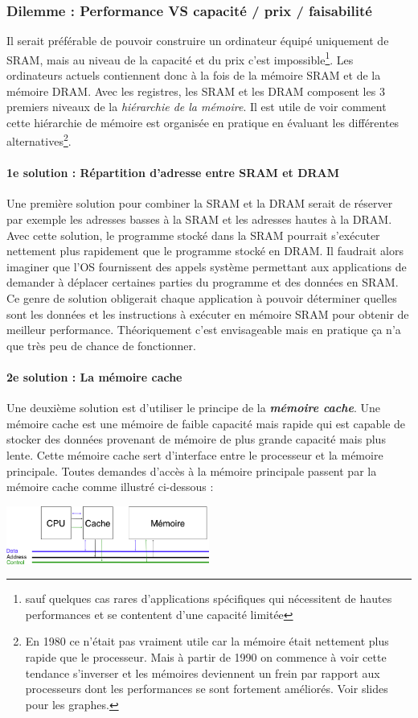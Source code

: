 \subsubsection*{Dilemme : Performance VS capacité / prix / faisabilité}
Il serait préférable de pouvoir construire un ordinateur équipé uniquement de SRAM, mais au niveau de la capacité et du prix c'est impossible\footnote{sauf quelques cas rares d'applications spécifiques qui nécessitent de hautes performances et se contentent d'une capacité limitée}.
Les ordinateurs actuels contiennent donc à la fois de la mémoire SRAM et de la mémoire DRAM.
Avec les registres, les SRAM et les DRAM composent les 3 premiers niveaux de la \textit{hiérarchie de la mémoire}.
Il est utile de voir comment cette hiérarchie de mémoire est organisée en pratique en évaluant les différentes alternatives\footnote{En 1980 ce n'était pas vraiment utile car la mémoire était nettement plus rapide que le processeur.
  Mais à partir de 1990 on commence à voir cette tendance s'inverser et les mémoires deviennent un frein par rapport aux processeurs dont les performances se sont fortement améliorés.
Voir slides pour les graphes.}.

\paragraph{1e solution : Répartition d'adresse entre SRAM et DRAM}
Une première solution pour combiner la SRAM et la DRAM serait de réserver par exemple les adresses basses à la SRAM et les adresses hautes à la DRAM.
Avec cette solution, le programme stocké dans la SRAM pourrait s'exécuter nettement plus rapidement que le programme stocké en DRAM.
Il faudrait alors imaginer que l'OS fournissent des appels système permettant aux applications de demander à déplacer certaines parties du programme et des données en SRAM.
Ce genre de solution obligerait chaque application à pouvoir déterminer quelles sont les données et les instructions à exécuter en mémoire SRAM pour obtenir de meilleur performance.
Théoriquement c'est envisageable mais en pratique ça n'a que très peu de chance de fonctionner.


\paragraph{2e solution : La mémoire cache}
Une deuxième solution est d'utiliser le principe de la \textit{\textbf{mémoire cache}}.
Une mémoire cache est une mémoire de faible capacité mais rapide qui est capable de stocker des données provenant de mémoire de plus grande capacité mais plus lente.
Cette mémoire cache sert d'interface entre le processeur et la mémoire principale.
Toutes demandes d'accès à la mémoire principale passent par la mémoire cache comme illustré ci-dessous : \\
\begin{center}
  \includegraphics[width=0.5\textwidth]{memcache1}
\end{center}

